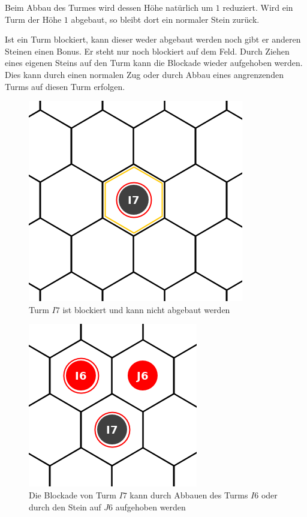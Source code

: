 Beim Abbau des Turmes wird dessen Höhe natürlich um $1$ reduziert. Wird ein Turm der Höhe $1$ abgebaut, so bleibt dort ein normaler Stein zurück.

Ist ein Turm blockiert, kann dieser weder abgebaut werden noch gibt er anderen Steinen einen Bonus. Er steht nur noch blockiert auf dem Feld. Durch Ziehen eines eigenen Steins auf den Turm kann die Blockade wieder aufgehoben werden. Dies kann durch einen normalen Zug oder durch Abbau eines angrenzenden Turms auf diesen Turm erfolgen.

\begin{figure}[ht]
\begin{center}
\includegraphics[scale=0.3]{graphic/tower-blocked.png}
\end{center}
\caption*{Turm $I7$ ist blockiert und kann nicht abgebaut werden}
\end{figure}

\begin{figure}[ht]
\begin{center}
\includegraphics[scale=0.3]{graphic/tower-unblock.png}
\end{center}
\caption*{Die Blockade von Turm $I7$ kann durch Abbauen des Turms $I6$ oder durch den Stein auf $J6$ aufgehoben werden}
\end{figure}

